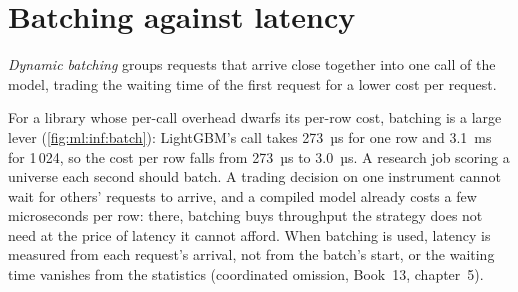 \section{Batching against latency}

\begin{definition}\label{def:ml:low-latency-inference:batch}
\emph{Dynamic batching} groups requests that arrive close together into one call of the model, trading
the waiting time of the first request for a lower cost per request.
\end{definition}

For a library whose per-call overhead dwarfs its per-row cost, batching is a large lever (\cref{fig:ml:inf:batch}): LightGBM's
call takes 273~µs for one row and 3.1~ms for 1\,024, so the cost per row falls from 273~µs to 3.0~µs. A research job scoring a
universe each second should batch. A trading decision on one instrument cannot wait for others' requests to arrive, and a
compiled model already costs a few microseconds per row: there, batching buys throughput the strategy does not need at the
price of latency it cannot afford. When batching is used, latency is measured from each request's arrival, not from the
batch's start, or the waiting time vanishes from the statistics (coordinated omission, Book~13, chapter~5).

\begin{omfigure}

\label{fig:ml:inf:batch}
\end{omfigure}

